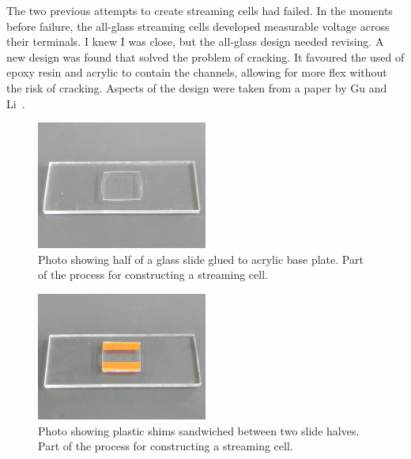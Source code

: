     The two previous attempts to create streaming cells had failed.
    In the moments before failure, the all-glass streaming cells developed measurable voltage across their terminals.
    I knew I was close, but the all-glass design needed revising.
    A new design was found that solved the problem of cracking.
    It favoured the used of epoxy resin and acrylic to contain the channels, allowing for more flex without the risk of cracking.
    Aspects of the design were taken from a paper by Gu and Li~\cite{Gu2000}.

    \begin{figure}[p]
      \centering
      \includegraphics[width=0.5\textwidth]{content/pt1/01-PowerHarvesting/graphics/Photo_streamingPotential_Assembly_Step1.JPG}
      \caption{\label{fig:Photo_streamingPotential_Assembly_Step1}Photo showing half of a glass slide glued to acrylic base plate. Part of the process for constructing a streaming cell.}
    \end{figure}
    \begin{figure}[p]
      \centering
      \includegraphics[width=0.5\textwidth]{content/pt1/01-PowerHarvesting/graphics/Photo_streamingPotential_Assembly_Step2.JPG}
      \caption{\label{fig:Photo_streamingPotential_Assembly_Step2}Photo showing plastic shims sandwiched between two slide halves. Part of the process for constructing a streaming cell.}
    \end{figure}
